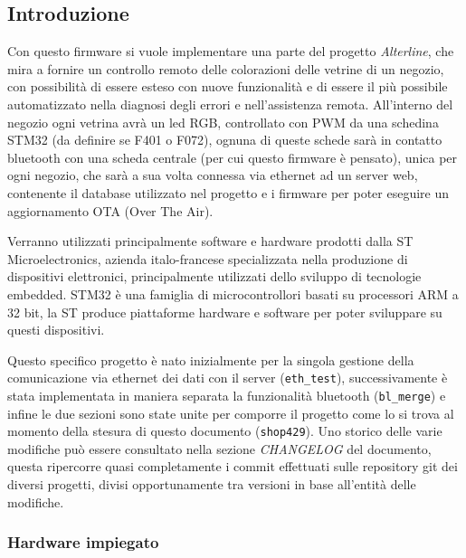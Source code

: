 
\subsection{Introduzione}

Con questo firmware si vuole implementare una parte del progetto \textit{Alterline}, che mira a fornire un controllo remoto delle colorazioni delle vetrine di un negozio, con possibilit\`a di essere esteso con nuove funzionalit\`a e di essere il pi\`u possibile automatizzato nella diagnosi degli errori e nell'assistenza remota. All'interno del negozio ogni vetrina avr\`a un led RGB, controllato con PWM da una schedina STM32 (da definire se F401 o F072), ognuna di queste schede sar\`a in contatto bluetooth con una scheda centrale (per cui questo firmware \`e pensato), unica per ogni negozio, che sar\`a a sua volta connessa via ethernet ad un server web, contenente il database utilizzato nel progetto e i firmware per poter eseguire un aggiornamento OTA (Over The Air).

Verranno utilizzati principalmente software e hardware prodotti dalla ST Microelectronics, azienda italo-francese specializzata nella produzione di dispositivi elettronici, principalmente utilizzati dello sviluppo di tecnologie embedded. STM32 \`e una famiglia di microcontrollori basati su processori ARM a 32 bit, la ST produce piattaforme hardware e software per poter sviluppare su questi dispositivi.

Questo specifico progetto \`e nato inizialmente per la singola gestione della comunicazione via ethernet dei dati con il server (\texttt{eth\_test}), successivamente \`e stata implementata in maniera separata la funzionalit\`a bluetooth (\texttt{bl\_merge}) e infine le due sezioni sono state unite per comporre il progetto come lo si trova al momento della stesura di questo documento (\texttt{shop429}). Uno storico delle varie modifiche pu\`o essere consultato nella sezione \textit{CHANGELOG} del documento, questa ripercorre quasi completamente i commit effettuati sulle repository git dei diversi progetti, divisi opportunamente tra versioni in base all'entit\`a delle modifiche.

\subsubsection{Hardware impiegato}

